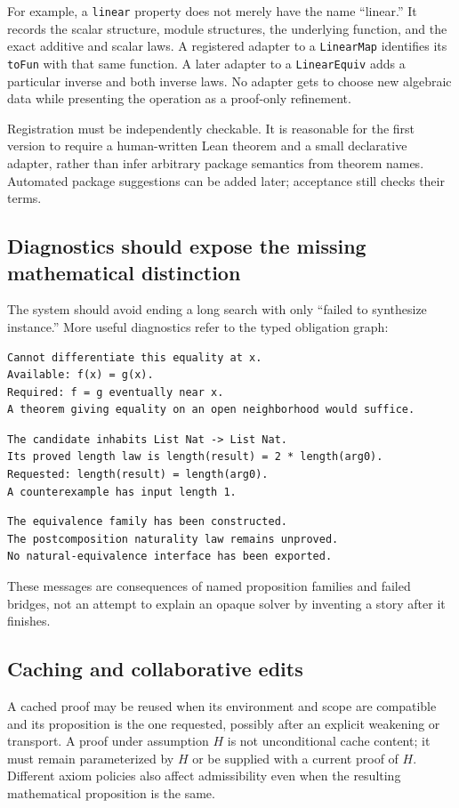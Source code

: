 \documentclass[11pt,letterpaper]{article}
\newcommand{\code}[1]{\nolinkurl{#1}}
\theoremstyle{definition}
\theoremstyle{remark}
\begin{document}
For example, a \code{linear} property does not merely have the name ``linear.''
It records the scalar structure, module structures, the underlying function,
and the exact additive and scalar laws. A registered adapter to a
\code{LinearMap} identifies its \code{toFun} with that same function. A later
adapter to a \code{LinearEquiv} adds a particular inverse and both inverse laws.
No adapter gets to choose new algebraic data while presenting the operation as
a proof-only refinement.

Registration must be independently checkable. It is reasonable for the first
version to require a human-written Lean theorem and a small declarative adapter,
rather than infer arbitrary package semantics from theorem names. Automated
package suggestions can be added later; acceptance still checks their terms.

\subsection{Diagnostics should expose the missing mathematical distinction}
The system should avoid ending a long search with only ``failed to synthesize
instance.'' More useful diagnostics refer to the typed obligation graph:
\begin{lstlisting}
Cannot differentiate this equality at x.
Available: f(x) = g(x).
Required: f = g eventually near x.
A theorem giving equality on an open neighborhood would suffice.
\end{lstlisting}
\begin{lstlisting}
The candidate inhabits List Nat -> List Nat.
Its proved length law is length(result) = 2 * length(arg0).
Requested: length(result) = length(arg0).
A counterexample has input length 1.
\end{lstlisting}
\begin{lstlisting}
The equivalence family has been constructed.
The postcomposition naturality law remains unproved.
No natural-equivalence interface has been exported.
\end{lstlisting}
These messages are consequences of named proposition families and failed
bridges, not an attempt to explain an opaque solver by inventing a story after
it finishes.

\subsection{Caching and collaborative edits}
A cached proof may be reused when its environment and scope are compatible and
its proposition is the one requested, possibly after an explicit weakening or
transport. A proof under assumption $H$ is not unconditional cache content; it
must remain parameterized by $H$ or be supplied with a current proof of $H$.
Different axiom policies also affect admissibility even when the resulting
mathematical proposition is the same.
\end{document}
